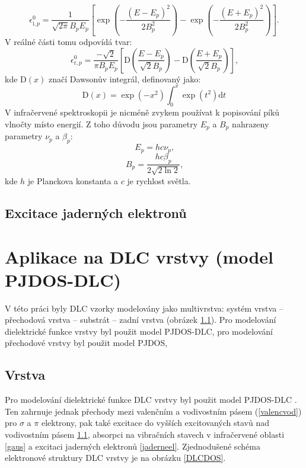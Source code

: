 \begin{equation}
\epsilon^0_{\mathrm{i},p} = \frac{1}{\sqrt{2 \pi} B_p E_p} \left[ \exp\left(-\frac{(E-E_p)^2}{2B_p^2}\right) - \exp\left(-\frac{(E+E_p)^2}{2B_p^2}\right) \right] \text{.}
\end{equation}
V reálné části tomu odpovídá tvar:
\begin{equation}
\epsilon^0_{\mathrm{r},p} = \frac{-\sqrt{2}}{\pi B_p E_p} \left[ \mathrm{D}\left(\frac{E-E_p}{\sqrt{2}B_p}\right) - \mathrm{D}\left(\frac{E+E_p}{\sqrt{2}B_p}\right) \right] \text{,}
\end{equation}
kde $\mathrm{D}(x)$ značí Dawsonův integrál, definovaný jako:
\begin{equation}
\mathrm{D}(x) = \exp(-x^2)\int_0^x \exp(t^2) \mathrm{d}t
\end{equation}
V infračervené spektroskopii je nicméně zvykem používat k popisování píků vlnočty místo energií. Z toho důvodu jsou parametry $E_p$ a $B_p$ nahrazeny parametry $\nu_p$ a $\beta_p$:
\begin{equation}
E_p = h c \nu_p \text{,}
\end{equation}
\begin{equation}
B_p = \frac{h c \beta_p}{2 \sqrt{2 \ln 2}} \text{,}
\end{equation}
kde $h$ je Planckova konstanta a $c$ je rychlost světla. 


\subsection{Excitace jaderných elektronů}



\section{Aplikace na DLC vrstvy (model PJDOS-DLC)}
V této práci byly DLC vzorky modelovány jako multivrstva: systém vrstva -- přechodová vrstva -- substrát -- zadní vrstva (obrázek \ref{}). Pro modelování dielektrické funkce vrstvy byl použit model PJDOS-DLC, pro modelování přechodové vrstvy byl použit model PJDOS, 

\subsection{Vrstva}
Pro modelování dielektrické funkce DLC vrstvy byl použit model PJDOS-DLC \cite{franta2007}. Ten zahrnuje jednak přechody mezi valenčním a vodivostním pásem (\ref{valencvod}) pro $\sigma$ a $\pi$ elektrony, pak také excitace do vyšších excitovaných stavů nad vodivostním pásem \ref{}, absorpci na vibračních stavech v infračervené oblasti \ref{gaus} a excitaci jaderných elektronů \ref{jaderneel}. Zjednodušené schéma elektronové struktury DLC vrstvy je na obrázku \ref{DLCDOS}.

